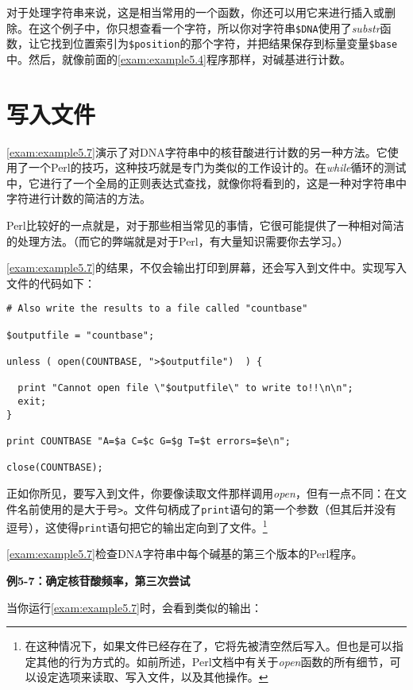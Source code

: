 对于处理字符串来说，这是相当常用的一个函数，你还可以用它来进行插入或删除。在这个例子中，你只想查看一个字符，所以你对字符串\verb|$DNA|使用了\textit{substr}函数，让它找到位置索引为\verb|$position|的那个字符，并把结果保存到标量变量\verb|$base|中。然后，就像前面的\autoref{exam:example5.4}程序那样，对碱基进行计数。

\section{写入文件}
  \autoref{exam:example5.7}演示了对DNA字符串中的核苷酸进行计数的另一种方法。它使用了一个Perl的技巧，这种技巧就是专门为类似的工作设计的。在\textit{while}循环的测试中，它进行了一个全局的正则表达式查找，就像你将看到的，这是一种对字符串中字符进行计数的简洁的方法。

Perl比较好的一点就是，对于那些相当常见的事情，它很可能提供了一种相对简洁的处理方法。（而它的弊端就是对于Perl，有大量知识需要你去学习。）

\autoref{exam:example5.7}的结果，不仅会输出打印到屏幕，还会写入到文件中。实现写入文件的代码如下：

\begin{lstlisting}
# Also write the results to a file called "countbase"

$outputfile = "countbase";

unless ( open(COUNTBASE, ">$outputfile")  ) {

  print "Cannot open file \"$outputfile\" to write to!!\n\n";
  exit;
}

print COUNTBASE "A=$a C=$c G=$g T=$t errors=$e\n";

close(COUNTBASE);
\end{lstlisting}

正如你所见，要写入到文件，你要像读取文件那样调用\textit{open}，但有一点不同：在文件名前使用的是大于号\verb|>|。文件句柄成了\verb|print|语句的第一个参数（但其后并没有逗号），这使得\verb|print|语句把它的输出定向到了文件。\footnote{在这种情况下，如果文件已经存在了，它将先被清空然后写入。但也是可以指定其他的行为方式的。如前所述，Perl文档中有关于\textit{open}函数的所有细节，可以设定选项来读取、写入文件，以及其他操作。}

\autoref{exam:example5.7}检查DNA字符串中每个碱基的第三个版本的Perl程序。

\textbf{例5-7：确定核苷酸频率，第三次尝试}


当你运行\autoref{exam:example5.7}时，会看到类似的输出：

